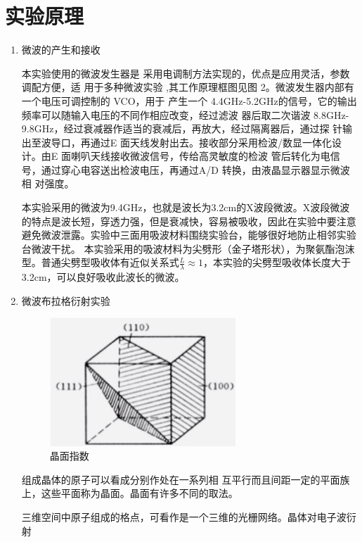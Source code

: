 \documentclass[11pt]{article}
\begin{document}
\section{实验原理}
\begin{enumerate}[itemjoin=\\]
    \item 微波的产生和接收
    \par \hspace*{2em} 本实验使用的微波发生器是
    采用电调制方法实现的，优点是应用灵活，参数调配方便，适
    用于多种微波实验 ,其工作原理框图见图 2。微波发生器内部有一个电压可调控制的 VCO，用于
    产生一个 4.4GHz-5.2GHz的信号，它的输出频率可以随输入电压的不同作相应改变，经过滤波
    器后取二次谐波 8.8GHz-9.8GHz，经过衰减器作适当的衰减后，再放大，经过隔离器后，通过探
    针输出至波导口，再通过E 面天线发射出去。接收部分采用检波/数显一体化设计。由E 面喇叭天线接收微波信号，传给高灵敏度的检波
    管后转化为电信号，通过穿心电容送出检波电压，再通过A/D 转换，由液晶显示器显示微波相
    对强度。
    \par \hspace*{2em} 本实验采用的微波为9.4GHz，也就是波长为3.2cm的X波段微波。X波段微波的特点是波长短，穿透力强，但是衰减快，容易被吸收，因此在实验中要注意避免微波泄露。实验中三面用吸波材料围绕实验台，能够很好地防止相邻实验台微波干扰。
    本实验采用的吸波材料为尖劈形（金子塔形状），为聚氨酯泡沫型。普通尖劈型吸收体有近似关系式$\frac{L}{\lambda}\approx1$，本实验的尖劈型吸收体长度大于3.2cm，可以良好吸收此波长的微波。
    \item 微波布拉格衍射实验
    \begin{figure}[H]
        \centering
        \includegraphics[width=7cm]{Fig/2.5.png}
        \caption{晶面指数}
    \end{figure}
    \par \hspace*{2em}组成晶体的原子可以看成分别作处在一系列相
    互平行而且间距一定的平面族上，这些平面称为晶面。晶面有许多不同的取法。
    \par \hspace*{2em}三维空间中原子组成的格点，可看作是一个三维的光栅网络。晶体对电子波衍射

\end{enumerate}
\end{document}
